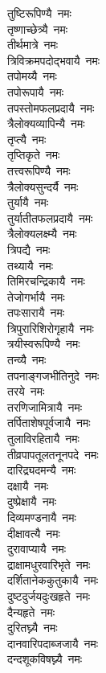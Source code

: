 \begin{multicols}{\maxColumns}
\begin{flushleft}
तुष्टिरूपिण्यै~नमः\\
तृष्णाच्छेत्र्यै~नमः\hfill{}\\
तीर्थमात्रे~नमः\\
त्रिविक्रमपदोद्भवायै~नमः\\
तपोमय्यै~नमः\\
तपोरूपायै~नमः\\
तपस्तोमफलप्रदायै~नमः\\
त्रैलोक्यव्यापिन्यै~नमः\\
तृप्त्यै~नमः\\
तृप्तिकृते~नमः\\
तत्त्वरूपिण्यै~नमः\\
त्रैलोक्यसुन्दर्यै~नमः\hfill{}\\
तुर्यायै~नमः\\
तुर्यातीतफलप्रदायै~नमः\\
त्रैलोक्यलक्ष्म्यै~नमः\\
त्रिपद्यै~नमः\\
तथ्यायै~नमः\\
तिमिरचन्द्रिकायै~नमः\\
तेजोगर्भायै~नमः\\
तपःसारायै~नमः\\
त्रिपुरारिशिरोगृहायै~नमः\\
त्रयीस्वरूपिण्यै~नमः\hfill{}\\
तन्व्यै~नमः\\
तपनाङ्गजभीतिनुदे~नमः\\
तरये~नमः\\
तरणिजामित्रायै~नमः\\
तर्पिताशेषपूर्वजायै~नमः\\
तुलाविरहितायै~नमः\\
तीव्रपापतूलतनूनपदे~नमः\\
दारिद्र्यदमन्यै~नमः\\
दक्षायै~नमः\\
दुष्प्रेक्षायै~नमः\hfill{}\\
दिव्यमण्डनायै~नमः\\
दीक्षावत्यै~नमः\\
दुरावाप्यायै~नमः\\
द्राक्षामधुरवारिभृते~नमः\\
दर्शितानेककुतुकायै~नमः\\
दुष्टदुर्जयदुःखहृते~नमः\\
दैन्यहृते~नमः\\
दुरितघ्न्यै~नमः\\
दानवारिपदाब्जजायै~नमः\\
दन्दशूकविषघ्न्यै~नमः\hfill{}\\

\end{flushleft}
\end{multicols}
